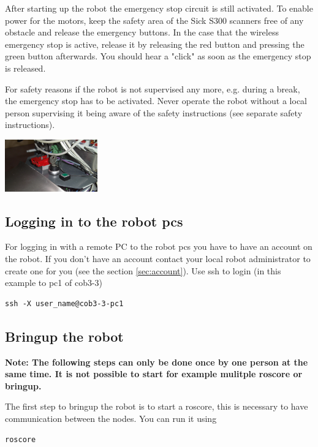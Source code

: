 After starting up the robot the emergency stop circuit is still activated. To enable power for the motors, keep the safety area of the Sick S300 scanners free of any obstacle and release the emergency buttons. In the case that the wireless emergency stop is active, release it by releasing the red button and pressing the green button afterwards. You should hear a "click" as soon as the emergency stop is released.

For safety reasons if the robot is not supervised any more, e.g. during a break, the emergency stop has to be activated. Never operate the robot without a local person supervising it being aware of the safety instructions (see separate safety instructions).

\begin{center}
\includegraphics[width=0.3\textwidth]{images/key.png}
\end{center}


\subsection{Logging in to the robot pcs}
For logging in with a remote PC to the robot pcs you have to have an account on the robot. If you don't have an account contact your local robot administrator to create one for you (see the section \ref{sec:account}). Use ssh to login (in this example to pc1 of cob3-3)

\begin{lstlisting}
ssh -X user_name@cob3-3-pc1
\end{lstlisting}

\subsection{Bringup the robot}
\textbf{Note: The following steps can only be done once by one person at the same time. It is not possible to start for example mulitple roscore or bringup.}

The first step to bringup the robot is to start a roscore, this is necessary to have communication between the nodes. You can run it using
\begin{lstlisting}
roscore
\end{lstlisting}

